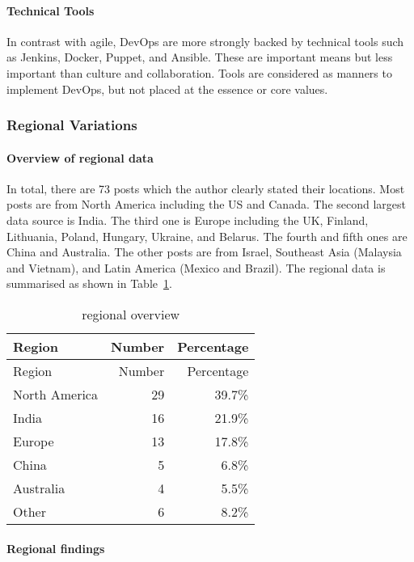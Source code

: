 \documentclass[
  12pt,
  a4paper,
]{article}
\begin{document}
\hypertarget{technical-tools}{%
\paragraph{Technical Tools}\label{technical-tools}}

In contrast with agile, DevOps are more strongly backed by technical
tools such as Jenkins, Docker, Puppet, and Ansible. These are important
means but less important than culture and collaboration. Tools are
considered as manners to implement DevOps, but not placed at the essence
or core values.

\hypertarget{regional-variations}{%
\subsubsection{Regional Variations}\label{regional-variations}}

\hypertarget{overview-of-regional-data}{%
\paragraph{Overview of regional data}\label{overview-of-regional-data}}

In total, there are 73 posts which the author clearly stated their
locations. Most posts are from North America including the US and
Canada. The second largest data source is India. The third one is Europe
including the UK, Finland, Lithuania, Poland, Hungary, Ukraine, and
Belarus. The fourth and fifth ones are China and Australia. The other
posts are from Israel, Southeast Asia (Malaysia and Vietnam), and Latin
America (Mexico and Brazil). The regional data is summarised as shown in
Table~\ref{tbl:regional}.

\hypertarget{tbl:regional}{}
\begin{longtable}[]{@{}lrr@{}}
\caption{\label{tbl:regional}regional overview}\tabularnewline
\toprule
Region & Number & Percentage\tabularnewline
\midrule
\endfirsthead
\toprule
Region & Number & Percentage\tabularnewline
\midrule
\endhead
North America & 29 & 39.7\%\tabularnewline
India & 16 & 21.9\%\tabularnewline
Europe & 13 & 17.8\%\tabularnewline
China & 5 & 6.8\%\tabularnewline
Australia & 4 & 5.5\%\tabularnewline
Other & 6 & 8.2\%\tabularnewline
\bottomrule
\end{longtable}

\hypertarget{regional-findings}{%
\paragraph{Regional findings}\label{regional-findings}}
\end{document}
